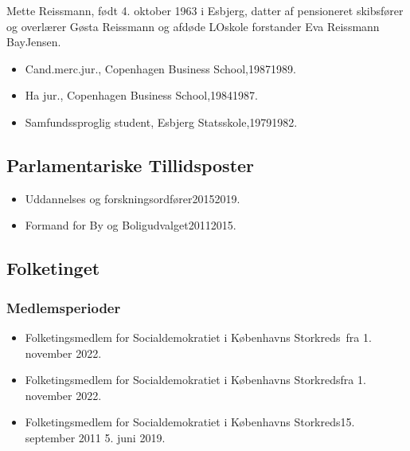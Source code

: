 \documentclass[11pt, a4paper]{awesome-cv}
\begin{document}
\makecvheader[R]
\makelettertitle
\begin{cvletter}
Mette Reissmann, født 4. oktober 1963 i Esbjerg, datter af pensioneret skibsfører og overlærer Gøsta Reissmann og afdøde LOskole forstander Eva Reissmann BayJensen.

\begin{itemize}
\item Cand.merc.jur., Copenhagen Business School,19871989.
\item Ha jur., Copenhagen Business School,19841987.
\item Samfundssproglig student, Esbjerg Statsskole,19791982.
\end{itemize}
\subsection*{Parlamentariske Tillidsposter}
\begin{itemize}
\item Uddannelses og forskningsordfører20152019.
\item Formand for By og Boligudvalget20112015.
\end{itemize}
\subsection*{Folketinget}
\subsubsection*{Medlemsperioder}
\begin{itemize}
\item Folketingsmedlem for Socialdemokratiet i Københavns Storkreds fra 1. november 2022.
\item Folketingsmedlem for Socialdemokratiet i Københavns Storkredsfra 1. november 2022.
\item Folketingsmedlem for Socialdemokratiet i Københavns Storkreds15. september 2011  5. juni 2019.
\end{itemize}

\end{cvletter}
\end{document}
